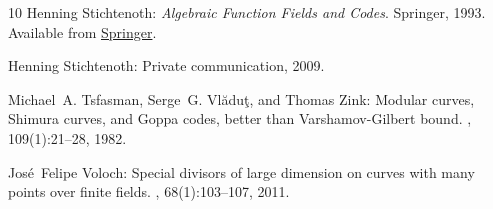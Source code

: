 \begin{thebibliography}{10}
{\sc Henning Stichtenoth}: {\em {Algebraic Function Fields and Codes}}.
\newblock Springer, 1993.
\newblock Available from
  \href{http://www.springer.com/mathematics/algebra/book/978-3-540-76877-7}{Springer}.

{\sc Henning Stichtenoth}: Private communication, 2009.

{\sc Michael~A. Tsfasman, Serge~G. Vl{\u{a}}du{\c{t}}, and Thomas Zink}:
  {Modular curves, {S}himura curves, and {G}oppa codes, better than
  {V}arshamov-{G}ilbert bound}.
, 109(1):21--28, 1982.

{\sc Jos\'{e}~Felipe Voloch}: Special divisors of large dimension on curves
  with many points over finite fields.
, 68(1):103--107, 2011.
\newblock [\epfmtdoi{10.4171/PM/1882}]

\end{thebibliography}
